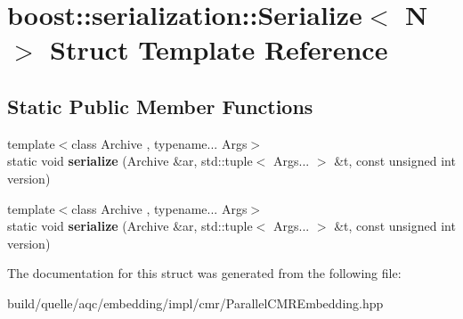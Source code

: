 \hypertarget{a00121}{}\section{boost\+:\+:serialization\+:\+:Serialize$<$ N $>$ Struct Template Reference}
\label{a00121}
\subsection*{Static Public Member Functions}
\begin{DoxyCompactItemize}
\item 
{\footnotesize template$<$class Archive , typename... Args$>$ }\\static void {\bfseries serialize} (Archive \&ar, std\+::tuple$<$ Args... $>$ \&t, const unsigned int version)\hypertarget{a00121_afa12c0ed58629b081f0cffb2fb7bcaea}{}\label{a00121_afa12c0ed58629b081f0cffb2fb7bcaea}

\item 
{\footnotesize template$<$class Archive , typename... Args$>$ }\\static void {\bfseries serialize} (Archive \&ar, std\+::tuple$<$ Args... $>$ \&t, const unsigned int version)\hypertarget{a00121_afa12c0ed58629b081f0cffb2fb7bcaea}{}\label{a00121_afa12c0ed58629b081f0cffb2fb7bcaea}

\end{DoxyCompactItemize}


The documentation for this struct was generated from the following file\+:\begin{DoxyCompactItemize}
\item 
build/quelle/aqc/embedding/impl/cmr/\+Parallel\+C\+M\+R\+Embedding.\+hpp\end{DoxyCompactItemize}
